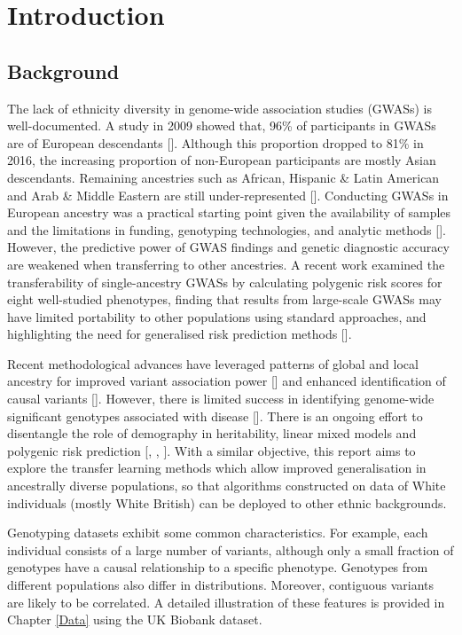 \documentclass[a4paper,12pt]{article}
\begin{document}
\section{Introduction} \label{introduction}
\subsection{Background}
The lack of ethnicity diversity in genome-wide association studies (GWASs) is well-documented. A study in 2009 showed that, 96\% of participants in GWASs are of European descendants [\cite{need2009next}]. Although this proportion dropped to 81\% in 2016, the increasing proportion of non-European participants are mostly Asian descendants. Remaining ancestries such as African, Hispanic \& Latin American and Arab \& Middle Eastern are still under-represented [\cite{popejoy2016genomics}]. Conducting GWASs in European ancestry was a practical starting point given the availability of samples and the limitations in funding, genotyping technologies, and analytic methods [\cite{peterson2019genome}]. However, the predictive power of GWAS findings and genetic diagnostic accuracy are weakened when transferring to other ancestries. A recent work examined the transferability of single-ancestry GWASs by calculating polygenic risk scores for eight well-studied phenotypes, finding that results from large-scale GWASs may have limited portability to other populations using standard approaches, and highlighting the need for generalised risk prediction methods [\cite{martin2017human}].

Recent methodological advances have leveraged patterns of global and local ancestry for improved variant association power [\cite{pasaniuc2011enhanced}] and enhanced identification of causal variants [\cite{zaitlen2010leveraging}]. However, there is limited success in identifying genome-wide significant genotypes associated with disease [\cite{martin2017human}]. There is an ongoing effort to disentangle the role of demography in heritability, linear mixed models and polygenic risk prediction [\cite{vilhjalmsson2015modeling}, \cite{carlson2013generalization}, \cite{martin2019clinical}]. With a similar objective, this report aims to explore the transfer learning methods which allow improved generalisation in ancestrally diverse populations, so that algorithms constructed on data of White individuals (mostly White British) can be deployed to other ethnic backgrounds.

Genotyping datasets exhibit some common characteristics. For example, each individual consists of a large number of variants, although only a small fraction of genotypes have a causal relationship to a specific phenotype. Genotypes from different populations also differ in distributions. Moreover, contiguous variants are likely to be correlated. A detailed illustration of these features is provided in Chapter \ref{Data} using the UK Biobank dataset.
\end{document}
